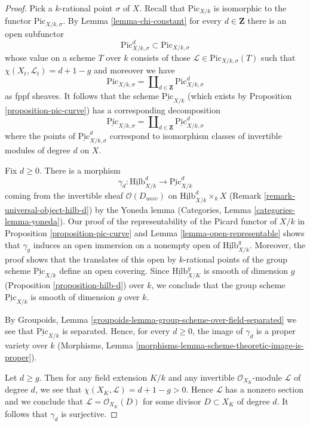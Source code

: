 \begin{proof}
Pick a $k$-rational point $\sigma$ of $X$. Recall that $\text{Pic}_{X/k}$
is isomorphic to the functor $\text{Pic}_{X/k, \sigma}$. By
Lemma \ref{lemma-chi-constant}
for every $d \in \mathbf{Z}$ there is an open subfunctor
$$
\text{Pic}^d_{X/k, \sigma} \subset \text{Pic}_{X/k, \sigma}
$$
whose value on a scheme $T$ over $k$ consists of those
$\mathcal{L} \in \text{Pic}_{X/k, \sigma}(T)$ such that
$\chi(X_t, \mathcal{L}_t) = d + 1 - g$ and moreover we have
$$
\text{Pic}_{X/k, \sigma} =
\coprod\nolimits_{d \in \mathbf{Z}} \text{Pic}^d_{X/k, \sigma}
$$
as fppf sheaves. It follows that the scheme $\underline{\text{Pic}}_{X/k}$
(which exists by Proposition \ref{proposition-pic-curve})
has a corresponding decomposition
$$
\underline{\text{Pic}}_{X/k, \sigma} =
\coprod\nolimits_{d \in \mathbf{Z}} \underline{\text{Pic}}^d_{X/k, \sigma}
$$
where the points of $\underline{\text{Pic}}^d_{X/k, \sigma}$ correspond
to isomorphism classes of invertible modules of degree $d$ on $X$.

\medskip\noindent
Fix $d \geq 0$. There is a morphism
$$
\gamma_d :
\underline{\text{Hilb}}^d_{X/k}
\longrightarrow
\underline{\text{Pic}}^d_{X/k}
$$
coming from the invertible sheaf $\mathcal{O}(D_{univ})$ on
$\underline{\text{Hilb}}^d_{X/k} \times_k X$
(Remark \ref{remark-universal-object-hilb-d}) by the Yoneda lemma
(Categories, Lemma \ref{categories-lemma-yoneda}).
Our proof of the representability of the Picard functor of $X/k$
in Proposition \ref{proposition-pic-curve} and
Lemma \ref{lemma-open-representable} shows that $\gamma_g$
induces an open immersion on a nonempty open of
$\underline{\text{Hilb}}^g_{X/k}$. Moreover, the proof shows
that the translates of this open by $k$-rational points of
the group scheme $\underline{\text{Pic}}_{X/k}$ define
an open covering. Since
$\underline{\text{Hilb}}^g_{X/K}$ is smooth of dimension $g$
(Proposition \ref{proposition-hilb-d})
over $k$, we conclude that the
group scheme $\underline{\text{Pic}}_{X/k}$ is smooth of dimension $g$
over $k$.

\medskip\noindent
By Groupoids, Lemma \ref{groupoids-lemma-group-scheme-over-field-separated}
we see that $\underline{\text{Pic}}_{X/k}$ is separated.
Hence, for every $d \geq 0$, the image of $\gamma_d$
is a proper variety over $k$
(Morphisms, Lemma \ref{morphisms-lemma-scheme-theoretic-image-is-proper}).

\medskip\noindent
Let $d \geq g$. Then for any field extension $K/k$ and any invertible
$\mathcal{O}_{X_K}$-module $\mathcal{L}$ of degree $d$, we see that
$\chi(X_K, \mathcal{L}) = d + 1 - g > 0$. Hence $\mathcal{L}$ has a
nonzero section and we conclude that $\mathcal{L} = \mathcal{O}_{X_K}(D)$
for some divisor $D \subset X_K$ of degree $d$. It follows that
$\gamma_d$ is surjective.


\end{proof}
